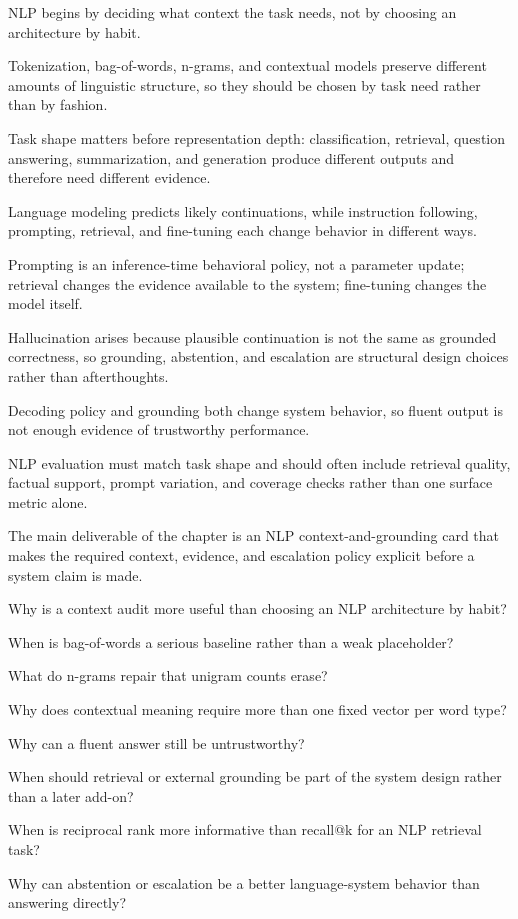 \begin{chaptersummary}
\item NLP begins by deciding what context the task needs, not by choosing an architecture by habit.
\item Tokenization, bag-of-words, n-grams, and contextual models preserve different amounts of linguistic structure, so they should be chosen by task need rather than by fashion.
\item Task shape matters before representation depth: classification, retrieval, question answering, summarization, and generation produce different outputs and therefore need different evidence.
\item Language modeling predicts likely continuations, while instruction following, prompting, retrieval, and fine-tuning each change behavior in different ways.
\item Prompting is an inference-time behavioral policy, not a parameter update; retrieval changes the evidence available to the system; fine-tuning changes the model itself.
\item Hallucination arises because plausible continuation is not the same as grounded correctness, so grounding, abstention, and escalation are structural design choices rather than afterthoughts.
\item Decoding policy and grounding both change system behavior, so fluent output is not enough evidence of trustworthy performance.
\item NLP evaluation must match task shape and should often include retrieval quality, factual support, prompt variation, and coverage checks rather than one surface metric alone.
\item The main deliverable of the chapter is an NLP context-and-grounding card that makes the required context, evidence, and escalation policy explicit before a system claim is made.
\end{chaptersummary}

\begin{studyquestions}
\item Why is a context audit more useful than choosing an NLP architecture by habit?
\item When is bag-of-words a serious baseline rather than a weak placeholder?
\item What do n-grams repair that unigram counts erase?
\item Why does contextual meaning require more than one fixed vector per word type?
\item Why can a fluent answer still be untrustworthy?
\item When should retrieval or external grounding be part of the system design rather than a later add-on?
\item When is reciprocal rank more informative than recall@k for an NLP retrieval task?
\item Why can abstention or escalation be a better language-system behavior than answering directly?
\end{studyquestions}

